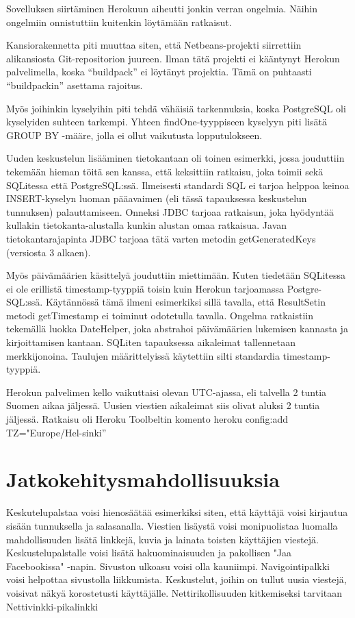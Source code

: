 \documentclass[titlepage]{article}
\begin{document}
\noindent Sovelluksen siirtäminen Herokuun aiheutti jonkin verran ongelmia. Näihin ongelmiin onnistuttiin kuitenkin löytämään ratkaisut.

Kansiorakennetta piti muuttaa siten, että Netbeans-projekti siirrettiin alikansiosta Git-repositorion juureen. Ilman tätä projekti ei kääntynyt Herokun palvelimella, koska “buildpack” ei löytänyt projektia. Tämä on puhtaasti “buildpackin” asettama rajoitus.

Myös joihinkin kyselyihin piti tehdä vähäisiä tarkennuksia, koska PostgreSQL oli kyselyiden suhteen tarkempi. Yhteen findOne-tyyppiseen kyselyyn piti lisätä GROUP BY -määre, jolla ei ollut vaikutusta lopputulokseen.

Uuden keskustelun lisääminen tietokantaan oli toinen esimerkki, jossa jouduttiin tekemään hieman töitä sen kanssa, että keksittiin ratkaisu, joka toimii sekä SQLitessa että PostgreSQL:ssä. Ilmeisesti standardi SQL ei tarjoa helppoa keinoa INSERT-kyselyn luoman pääavaimen (eli tässä tapauksessa keskustelun tunnuksen) palauttamiseen. Onneksi JDBC tarjoaa ratkaisun, joka hyödyntää kullakin tietokanta-alustalla kunkin alustan omaa ratkaisua. Javan tietokantarajapinta JDBC tarjoaa tätä varten metodin getGeneratedKeys (versiosta 3 alkaen).

Myös päivämäärien käsittelyä jouduttiin miettimään. Kuten tiedetään SQLitessa ei ole erillistä timestamp-tyyppiä toisin kuin Herokun tarjoamassa Postgre-SQL:ssä. Käytännössä tämä ilmeni esimerkiksi sillä tavalla, että ResultSetin metodi getTimestamp ei toiminut odotetulla tavalla. Ongelma ratkaistiin tekemällä luokka DateHelper, joka abstrahoi päivämäärien lukemisen kannasta ja kirjoittamisen kantaan. SQLiten tapauksessa aikaleimat tallennetaan merkkijonoina. Taulujen määrittelyissä käytettiin silti standardia timestamp-tyyppiä.

Herokun palvelimen kello vaikuttaisi olevan UTC-ajassa, eli talvella 2 tuntia Suomen aikaa jäljessä. Uusien viestien aikaleimat siis olivat aluksi 2 tuntia jäljessä. Ratkaisu oli Heroku Toolbeltin komento heroku config:add TZ="Europe/Hel-sinki”


\section*{Jatkokehitysmahdollisuuksia}

Keskutelupalstaa voisi hienosäätää esimerkiksi siten, että käyttäjä voisi kirjautua sisään tunnuksella ja salasanalla. Viestien lisäystä voisi monipuolistaa luomalla mahdollisuuden lisätä linkkejä, kuvia ja lainata toisten käyttäjien viestejä. Keskustelupalstalle voisi lisätä hakuominaisuuden ja pakollisen "Jaa Facebookissa" -napin. Sivuston ulkoasu voisi olla kauniimpi. Navigointipalkki voisi helpottaa sivustolla liikkumista. Keskustelut, joihin on tullut uusia viestejä, voisivat näkyä korostetusti käyttäjälle. Nettirikollisuuden kitkemiseksi tarvitaan Nettivinkki-pikalinkki 
\end{document}
